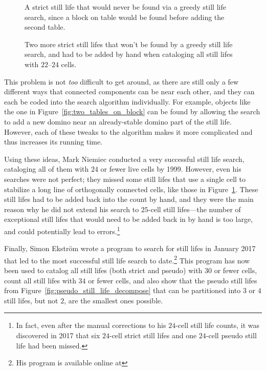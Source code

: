 \begin{figure}[!htb]
	\centering
	\begin{minipage}{.42\textwidth}
		\centering
		\caption{A strict still life that would never be found via a greedy still life search, since a block on table would be found before adding the second table.}\label{fig:two_tables_on_block}
	\end{minipage} \hfill %
	\begin{minipage}{.54\textwidth}
		\centering
		\caption{Two more strict still lifes that won't be found by a greedy still life search, and had to be added by hand when cataloging all still lifes with $22$--$24$ cells.}\label{fig:sl_hard_to_find}
	\end{minipage}
\end{figure}

This problem is not \emph{too} difficult to get around, as there are still only a few different ways that connected components can be near each other, and they can each be coded into the search algorithm individually. For example, objects like the one in Figure~\ref{fig:two_tables_on_block} can be found by allowing the search to add a new domino near an already-stable domino part of the still life. However, each of these tweaks to the algorithm makes it more complicated and thus increases its running time.

Using these ideas, Mark Niemiec conducted a very successful still life search, cataloging all of them with $24$ or fewer live cells by 1999. However, even his searches were not perfect; they missed some still lifes that use a single cell to stabilize a long line of orthogonally connected cells, like those in Figure~\ref{fig:sl_hard_to_find}. These still lifes had to be added back into the count by hand, and they were the main reason why he did not extend his search to $25$-cell still lifes---the number of exceptional still lifes that would need to be added back in by hand is too large, and could potentially lead to errors.\footnote{In fact, even after the manual corrections to his $24$-cell still life counts, it was discovered in 2017 that six $24$-cell strict still lifes and one $24$-cell pseudo still life had been missed.}

Finally, Simon Ekström wrote a program to search for still lifes in January 2017 that led to the most successful still life search to date.\footnote{His program is available online at } This program has now been used to catalog all still lifes (both strict and pseudo) with $30$ or fewer cells, count all still lifes with $34$ or fewer cells, and also show that the pseudo still lifes from Figure~\ref{fig:pseudo_still_life_decompose} that can be partitioned into $3$ or $4$ still lifes, but not $2$, are the smallest ones possible.


